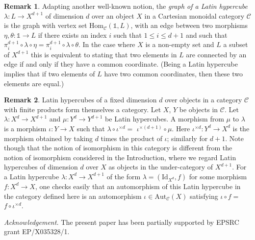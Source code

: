 \documentclass{amsart} %
\theoremstyle{plain}\newtheorem{Theorem}{Theorem}[section]
\theoremstyle{plain}\newtheorem{Conjecture}[Theorem]{Conjecture}
\theoremstyle{plain}\newtheorem{Corollary}[Theorem]{Corollary}
\theoremstyle{plain}\newtheorem{Lemma}[Theorem]{Lemma}
\theoremstyle{plain}\newtheorem{Proposition}[Theorem]{Proposition}
\theoremstyle{definition}\newtheorem{Definition}[Theorem]{Definition}
\theoremstyle{definition}\newtheorem{Example}[Theorem]{Example}
\theoremstyle{definition}\newtheorem{Examples}[Theorem]{Examples}
\theoremstyle{definition}\newtheorem{Remark}[Theorem]{Remark}
\theoremstyle{definition}\newtheorem{Remarks}[Theorem]{Remarks}
\theoremstyle{plain}\newtheorem{Statement}[Theorem]{}
\def\CC{{\mathcal{C}}}    \def\OP{{\mathcal{O}P}}
\def\One{{\mathds{1}}}
\def\Aut{\mathrm{Aut}}   \def\bAut{\mathbf{Aut}}        \def\tenk{\otimes_k}
\def\Hom{\mathrm{Hom}}           \def\tenkS{\otimes_{kS}}
\def\Id{\mathrm{Id}}             \def\tenA{\otimes_A}
\begin{document}
\begin{Remark}
Adapting another well-known notion, the {\em graph of a Latin hypercube}
$\lambda : L\to X^{d+1}$ of dimension $d$ over an object $X$ in a Cartesian
monoidal category $\CC$ is the graph with vertex set $\Hom_\CC(\One,L)$,
with an edge  between two morphisms $\eta, \theta : \One\to L$ if there exists
an index $i$ such that $1\leq i\leq d+1$ and such that
$\pi^{d+1}_i\circ\lambda\circ \eta = \pi^{d+1}_i\circ\lambda\circ\theta.$
In the case where $X$ is a non-empty set and $L$ a subset of $X^{d+1}$
this is equivalent to stating that two elements in $L$
are connected by an edge if and only if they have a common coordinate. 
(Being a Latin
hypercube implies that if two elements of $L$ have two common coordinates, then
these two elements are equal.)
\end{Remark}

\begin{Remark}
Latin hypercubes of a fixed dimension $d$ over objects in a category $\CC$ with finite
products form themselves  a category. Let $X$, $Y$ be objects in $\CC$. Let
$\lambda : X^d\to X^{d+1}$ and $\mu : Y^d \to Y^{d+1}$ be Latin hypercubes.
A morphism from $\mu$ to $\lambda$ is a morphism $\iota : Y\to X$ such that
$\lambda\circ \iota^{\times d} =$ $\iota^{\times(d+1)}\circ\mu$. Here $\iota^{\times d} :
Y^d\to X^d$ is the morphism obtained by taking $d$ times the product of $\iota$;
similarly for $d+1$. Note though that the notion of isomorphism in this category is
different from the notion of isomorphism considered in the Introduction, 
where we regard Latin hypercubes of dimension $d$ over $X$   as objects in the 
 under-category of $X^{d+1}$. For a Latin hypercube
$\lambda : X^d\to X^{d+1}$ of the form $\lambda = (\Id_{X^d}, f)$ for some
morphism $f : X^d\to X$, one checks easily that 
an automorphism of this Latin hypercube in the category
defined here  is an automorphism $\iota\in\Aut_\CC(X)$ satisfying 
 $\iota\circ f=$ $f\circ \iota^{\times d}$.
\end{Remark}


\bigskip\noindent
{\em Acknowledgement.} The present paper has been partially supported by
EPSRC grant EP/X035328/1.

\end{document}
